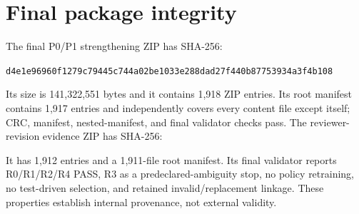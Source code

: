 \documentclass[10pt,a4paper]{article}
\begin{document}
\section{Final package integrity}
The final P0/P1 strengthening ZIP has SHA-256:
\begin{center}\small\texttt{d4e1e96960f1279c79445c744a02be1033e288dad27f440b87753934a3f4b108}\end{center}
Its size is 141,322,551 bytes and it contains 1,918 ZIP entries. Its root manifest contains 1,917 entries and independently covers every content file except itself; CRC, manifest, nested-manifest, and final validator checks pass. The reviewer-revision evidence ZIP has SHA-256:
\begin{center}\small{}\end{center}
It has 1,912 entries and a 1,911-file root manifest. Its final validator reports R0/R1/R2/R4 PASS, R3 as a predeclared-ambiguity stop, no policy retraining, no test-driven selection, and retained invalid/replacement linkage. These properties establish internal provenance, not external validity.
\clearpage


\end{document}
